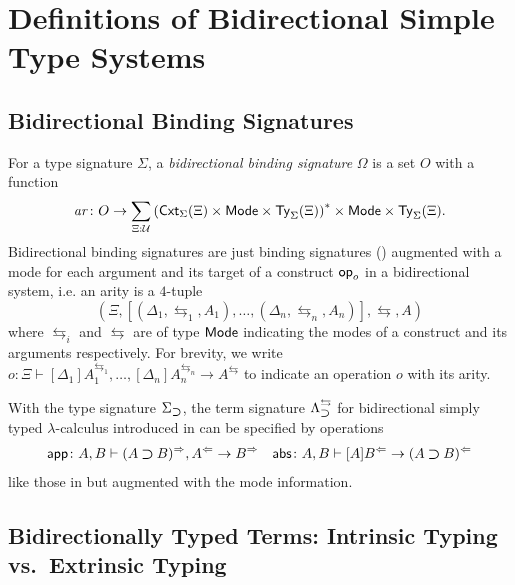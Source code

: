 \documentclass[acmsmall]{acmart}
\theoremstyle{acmdefinition}
\begin{document}
\section{Definitions of Bidirectional Simple Type Systems} 

\subsection{Bidirectional Binding Signatures}

\begin{definition}
  For a type signature $\Sigma$, a \emph{bidirectional binding signature} $\Omega$ is a set $O$ with a function
  \[
    \mathit{ar}\colon O \to \sum_{\Xi : \mathcal{U}} \left(\mathsf{Cxt}_{\Sigma}(\Xi) \times \mathsf{Mode} \times \mathsf{Ty}_{\Sigma}(\Xi)\right)^* \times \mathsf{Mode} \times \mathsf{Ty}_{\Sigma}(\Xi).
  \]
  Bidirectional binding signatures are just binding signatures () augmented with a mode for each argument and its target of a construct $\mathsf{op}_o$ in a bidirectional system, i.e.
  an arity is a $4$-tuple
  \[
    \left(\Xi, \left[\left(\Delta_1, \leftrightarrows_1, A_1\right), \ldots, \left(\Delta_{n}, \leftrightarrows_n, A_{n}\right) \right], \leftrightarrows, A\right)
  \]
  where ${\leftrightarrows_i}$ and ${\leftrightarrows}$ are of type $\mathsf{Mode}$ indicating the modes of a construct and its arguments respectively.
  For brevity, we write $o \colon \Xi \vdash [\Delta_1]A_{1}^{\leftrightarrows_1}, \ldots, [\Delta_{n}] A^{\leftrightarrows_n}_{n} \to A^{\leftrightarrows}$ to indicate an operation $o$ with its arity. 
\end{definition}

\begin{example}
  With the type signature $\Sigma_{\mathbin{\bm{\supset}}}$, the term signature $\Lambda_{\mathbin{\bm{\supset}}}^{\leftrightarrows}$ for bidirectional simply typed $\lambda$-calculus introduced in  can be specified by operations 
  \begin{align*}
    \mathsf{app}\colon A, B \vdash (A \mathbin{\bm{\supset}} B)^{\Rightarrow}, A^{\Leftarrow} \to B^{\Rightarrow} &&
    \mathsf{abs}\colon A , B \vdash [A]B^{\Leftarrow} \to (A \mathbin{\bm{\supset}} B)^{\Leftarrow}
  \end{align*}
  like those in  but augmented with the mode information.
\end{example}

\subsection{Bidirectionally Typed Terms: Intrinsic Typing vs.\ Extrinsic Typing}
\end{document}
